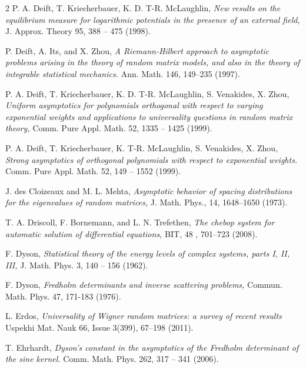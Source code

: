 \documentclass[11pt,letterpaper,reqno]{amsart}
\theoremstyle{definition}
\theoremstyle{remark}
\numberwithin{equation}{section}
\begin{document}
\begin{thebibliography}{2}
 P. A. Deift, T. Kriecherbauer, K. D. T-R. McLaughlin,
{\it New results on the equilibrium measure for logarithmic potentials in
the presence of an external field}, J. Approx. Theory 95, 388 -- 475 (1998).

 P. Deift, A. Its, and X. Zhou, {\it A Riemann-Hilbert
  approach to asymptotic problems arising in the theory of random
  matrix models, and also in the theory of integrable statistical
  mechanics.} Ann. Math. 146, 149--235 (1997).

 P. A. Deift, T. Kriecherbauer, K. D. T-R. McLaughlin, S. Venakides, X.  Zhou,
{\it  Uniform asymptotics for polynomials orthogonal with respect to varying exponential weights and
applications to universality questions in random matrix theory, }  Comm. Pure Appl. Math. 52, 1335 -- 1425 (1999).

 P. A.  Deift, T.  Kriecherbauer, K. T-R.  McLaughlin, S. Venakides, X. Zhou, {\it Strong
asymptotics of orthogonal polynomials with respect to exponential weights.} Comm. Pure Appl.
Math.  52, 149 -- 1552 (1999).

 J. des Cloizeaux and M. L. Mehta,
{\it Asymptotic behavior of spacing distributions for the eigenvalues of
random matrices,} J. Math. Phys., 14,   1648--1650 (1973).



 T. A.  Driscoll, F.  Bornemann,  and L. N. Trefethen, {\it The chebop system for automatic
solution of differential equations,}  BIT, 48 , 701--723 (2008).


 F. Dyson, {\it Statistical theory of the energy levels of complex systems, parts I, II, III,}
J. Math. Phys. 3,  140 -- 156 (1962).

 F. Dyson, {\it Fredholm determinants and inverse scattering problems,}  Commun. Math. Phys.  47,
171-183 (1976).


 L. Erdos, {\it Universality of Wigner random matrices: a survey of recent results}
Uspekhi Mat. Nauk 66, Issue 3(399),  67--198  (2011).

 T. Ehrhardt, {\it Dyson's constant in the asymptotics of the Fredholm
determinant of the sine kernel.} Comm. Math. Phys. 262, 317 -- 341   (2006).


\end{thebibliography}
\end{document}
